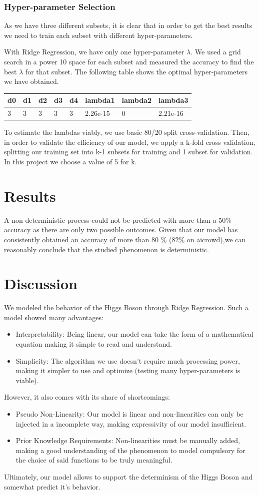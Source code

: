 \documentclass[10pt,conference,compsocconf]{IEEEtran}
\begin{document}
\subsubsection{Hyper-parameter Selection}
 As we have three different subsets, it is clear that in order to get the best results we need to train each subset with different hyper-parameters.
 
 With Ridge Regression, we have only one hyper-parameter $\lambda $. We used a grid search in a power 10 space for each subset and measured the accuracy to find the best $\lambda $ for that subset.
 The following table shows the optimal hyper-parameters we have obtained.
 \vspace{3mm}
{
\small
\begin{tabular}[c]{|l||l|l|l|l|l|l|l|}
\hline
d0&d1&d2&d3&d4&lambda1&lambda2&lambda3\\
\hline
3&3&3&3&3&2.26e-15&0&2.21e-16
\end{tabular}
}
\vspace{3mm}

To estimate the lambdas viably, we use basic 80/20 split cross-validation.  
Then, in order to validate the efficiency of our model, we apply a k-fold cross validation, splitting our training set into k-1 subsets for training and 1 subset for validation. In this project we choose a value of 5 for k.
\section{Results}
A non-deterministic process could not be predicted with more than a 50\% accuracy as there are only two possible outcomes.
Given that our model has consistently obtained an accuracy of more than 80 \% (82\% on aicrowd),we can reasonably conclude that the studied phenomenon is deterministic.
\section{Discussion}
We modeled the behavior of the Higgs Boson through Ridge Regression. Such a model showed many advantages:
\begin{itemize}
\item Interpretability: Being linear, our model can take the form of a mathematical equation making it simple to read and understand. 
\item Simplicity: The algorithm we use doesn't require much processing power, making it simpler to use and optimize (testing many hyper-parameters is viable).
\end{itemize}
However, it also comes with its share of shortcomings:
\begin{itemize}
\item Pseudo Non-Linearity: Our model is linear and non-linearities can only be injected in a incomplete way, making expressivity of our model insufficient. 
\item Prior Knowledge Requirements: Non-linearities must be manually added, making a good understanding of the phenomenon to model compulsory for the choice of said functions to be truly meaningful.
\end{itemize}
Ultimately, our model allows to support the determinism of the Higgs Boson and somewhat predict it's behavior. 
\end{document}
